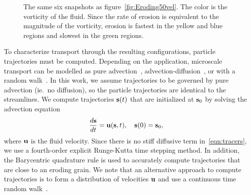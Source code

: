 \documentclass{jfm}
\begin{document}
\begin{figure}
\begin{center}
\caption{\label{fig:Eroding50vort} The same six snapshots as
figure~\ref{fig:Eroding50vel}.  The color is the vorticity of the fluid.
Since the rate of erosion is equivalent to the magnitude of the
vorticity, erosion is fastest in the yellow and blue regions and slowest
in the green regions.}
\end{center}
\end{figure}

To characterize transport through the resulting configurations, particle
trajectories must be computed. Depending on the application, microscale
transport can be modelled as pure advection~\citep{dea-qua-bir-jua2018,
leb-ded-dav-bou2007, cve-che-wen1996, puy-gou-den2019},
advection-diffusion~\citep{cus-hu-den1995, dag1987, den-ica-hid2018}, or
with a random walk~\citep{saf1959, bij-blu2006, ber-sch-sil2000}.  In
this work, we assume trajectories to be governed by pure advection
(ie.~no diffusion), so the particle trajectories are identical to the
streamlines. We compute trajectories $\ss(t)$ that are initialized at
$\ss_0$ by solving the advection equation
\begin{align}
  \frac{d\ss}{dt} = \uu(\ss,t), \quad \ss(0) = \ss_0,
  \label{eqn:tracers}
\end{align}
where $\uu$ is the fluid velocity.  Since there is no stiff diffusive
term in~\eqref{eqn:tracers}, we use a fourth-order explicit Runge-Kutta
time stepping method.  In addition, the Barycentric quadrature rule is
used to accurately compute trajectories that are close to an eroding
grain. We note that an alternative approach to compute trajectories is
to form a distribution of velocities $\uu$ and use a continuous time
random walk~\citep{mon-wei1965, den-cor-sch-ber2004, leb-den-car2008,
ber-cor-den-sch2006}.  
\end{document}
